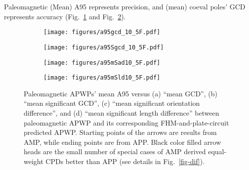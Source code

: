 Paleomagnetic (Mean) A95 represents precision, and (mean) coeval poles' GCD
represents accuracy (Fig.~\ref{fig-A95GCD105F} and Fig.~\ref{fig-A95SGCD105F}).

\begin{figure}
\captionsetup[subfigure]{singlelinecheck=off,justification=raggedright,aboveskip=-6pt,belowskip=-6pt}
\centering
  \begin{subfigure}[htbp]{.49\textwidth}
	\caption{}\texttt{[image: figures/a95gcd\_10\_5F.pdf]}\label{fig-A95GCD105F}
  \end{subfigure}
  \begin{subfigure}[htbp]{.49\textwidth}
	\caption{}\texttt{[image: figures/a95Sgcd\_10\_5F.pdf]}\label{fig-A95SGCD105F}
  \end{subfigure}
  \begin{subfigure}[htbp]{.49\textwidth}
	\caption{}\texttt{[image: figures/a95mSad10\_5F.pdf]}\label{fig-A95mSad105F}
  \end{subfigure}
  \begin{subfigure}[htbp]{.49\textwidth}
	\caption{}\texttt{[image: figures/a95mSld10\_5F.pdf]}\label{fig-A95mSld105F}
  \end{subfigure}
\caption[APP spatially better than AMP]{Paleomagnetic APWPs' mean A95 versus
(a) ``mean GCD'', (b) ``mean significant GCD'', (c) ``mean significant
orientation difference'', and (d) ``mean significant length difference'' between
paleomagnetic APWP and its corresponding FHM-and-plate-circuit predicted APWP\@.
Starting points of the arrows are results from AMP, while ending points are from
APP\@. Black color filled arrow heads are the small number of special cases of
AMP derived equal-weight CPDs better than APP (see details in
Fig.~\ref{fig-dif}).}\label{fig-A95mG105F}
\end{figure}

